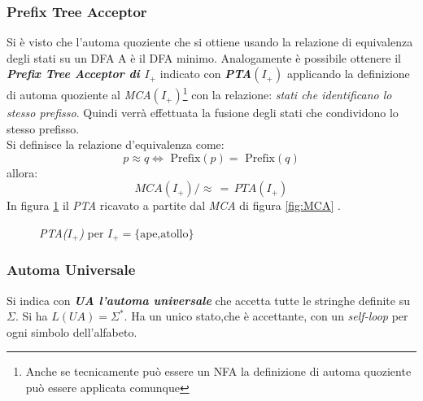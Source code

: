 \subsubsection{Prefix Tree Acceptor}
Si è visto che l'automa quoziente che si ottiene usando la relazione di equivalenza degli stati su un \ac{DFA} A è il \ac{DFA} minimo. Analogamente è possibile ottenere il \textit{\textbf{Prefix Tree Acceptor di $I_+$}} indicato con \textit{\textbf{PTA$(I_+)$}} applicando la definizione di automa quoziente al \textit{MCA$(I_+)$}\footnote{Anche se tecnicamente può essere un \ac{NFA} la definizione di automa quoziente può essere applicata comunque} con la relazione: \textit{stati che identificano lo stesso prefisso}. Quindi verrà effettuata la fusione degli stati che condividono lo stesso prefisso.\\
Si definisce la relazione d'equivalenza come:
\begin{equation*}
p \approx q \Leftrightarrow \text{ Prefix}(p) = \text{ Prefix}(q)
\end{equation*}
allora:
\begin{equation*}
MCA(I_+)/\!\!\approx \,=\, PTA(I_+)
\end{equation*}
In figura \ref{fig:PTA} il \textit{PTA} ricavato a partite dal \textit{MCA} di figura \ref{fig:MCA} .
\begin{figure}[htp]
\centering
{}
\caption[Prefix Tre Acceptor]{\textit{PTA($I_+$)} per $I_+=\{\text{ape,atollo}\}$}
\label{fig:PTA}
\end{figure}

\subsubsection{Automa Universale}
Si indica con \textit{\textbf{UA l'automa universale}} che accetta tutte le stringhe definite su $\Sigma$. Si ha $L(UA) = \Sigma^{*}$. Ha un unico stato,che è accettante, con un \textit{self-loop} per ogni simbolo dell'alfabeto.

